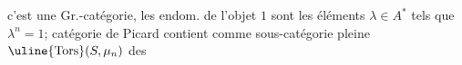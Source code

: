 
 c'est une Gr.-catégorie,   les endom. de l'objet $1$ sont les éléments $\lambda\in A^*$ tels que $\lambda^n=1$;  catégorie de Picard contient comme sous-catégorie pleine $\uline{\operatorname{Tors}}(S,\mu_n)$ des
